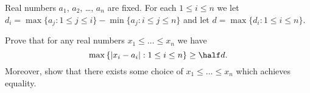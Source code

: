 Real numbers $a_1$, $a_2$, \dots, $a_n$ are fixed.
For each $1 \le i \le n$ we let
$d_i = \max\{a_j : 1 \le j \le i\} - \min\{a_j : i \le j \le n\}$
and let $d = \max \{d_i : 1 \le i \le n\}$.

\begin{enumerate}[(a)]
  \ii Prove that for any real numbers $x_1 \le \dots \le x_n$ we have
  \[
    \max \left\{ \left\lvert x_i - a_i \right\rvert :
      1 \le i \le n \right\}
      \ge \half d.
  \]
  \ii Moreover, show that there exists some
  choice of $x_1 \le \dots \le x_n$ which achieves equality.
\end{enumerate}